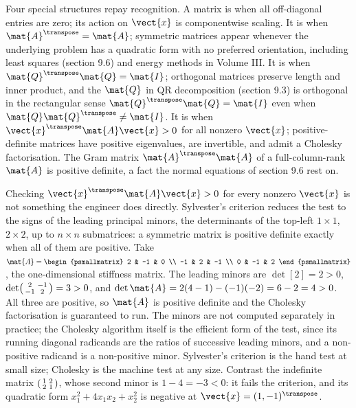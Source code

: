Four special structures repay recognition. A matrix is
 when all off-diagonal entries are zero; its action
on $\vect{x}$ is componentwise scaling. It is 
when $\mat{A}^{\transpose} = \mat{A}$; symmetric matrices appear
whenever the underlying problem has a quadratic form with no
preferred orientation, including least squares (section 9.6) and
energy methods in Volume III. It is  when
$\mat{Q}^{\transpose}\mat{Q} = \mat{I}$; orthogonal matrices preserve
length and inner product, and the $\mat{Q}$ in QR decomposition
(section 9.3) is orthogonal in the rectangular sense
$\mat{Q}^{\transpose}\mat{Q} = \mat{I}$ even when $\mat{Q}\mat{Q}^{\transpose}
\neq \mat{I}$. It is  when $\vect{x}^{\transpose}
\mat{A}\vect{x} > 0$ for all nonzero $\vect{x}$; positive-definite
matrices have positive eigenvalues, are invertible, and admit a
Cholesky factorisation. The Gram matrix $\mat{A}^{\transpose}\mat{A}$
of a full-column-rank $\mat{A}$ is positive definite, a fact the
normal equations of section 9.6 rest on.

\begin{example}
Checking $\vect{x}^{\transpose}\mat{A}\vect{x} > 0$ for every nonzero
$\vect{x}$ is not something the engineer does directly. Sylvester's
criterion reduces the test to the signs of the leading principal minors,
the determinants of the top-left $1 \times 1$, $2 \times 2$, up to $n
\times n$ submatrices: a symmetric matrix is positive definite exactly
when all of them are positive. Take $\mat{A} = \begin{psmallmatrix} 2 &
-1 & 0 \\ -1 & 2 & -1 \\ 0 & -1 & 2 \end{psmallmatrix}$, the
one-dimensional stiffness matrix. The leading minors are $\det[2] = 2 >
0$, $\det\begin{psmallmatrix} 2 & -1 \\ -1 & 2 \end{psmallmatrix} = 3 >
0$, and $\det\mat{A} = 2(4-1) - (-1)(-2) = 6 - 2 = 4 > 0$. All three
are positive, so $\mat{A}$ is positive definite and the Cholesky
factorisation is guaranteed to run. The minors are not computed
separately in practice; the Cholesky algorithm itself is the efficient
form of the test, since its running diagonal radicands are the ratios of
successive leading minors, and a non-positive radicand is a
non-positive minor. Sylvester's criterion is the hand test at small
size; Cholesky is the machine test at any size. Contrast the indefinite
matrix $\begin{psmallmatrix} 1 & 2 \\ 2 & 1 \end{psmallmatrix}$, whose
second minor is $1 - 4 = -3 < 0$: it fails the criterion, and its
quadratic form $x_{1}^{2} + 4x_{1}x_{2} + x_{2}^{2}$ is negative at
$\vect{x} = (1, -1)^{\transpose}$.
\end{example}


